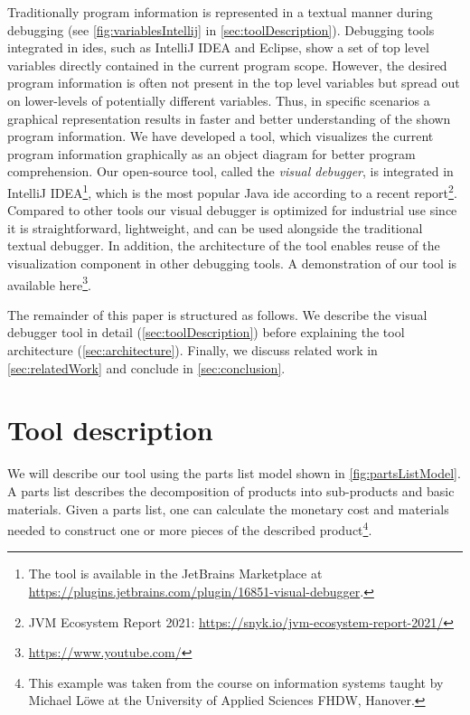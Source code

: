 \documentclass[conference]{IEEEtran}
\newcommand{\intellij}{IntelliJ IDEA}
\newcommand{\screencast}{\url{https://www.youtube.com/}}
\begin{document}
Traditionally program information is represented in a textual manner during debugging (see \autoref{fig:variablesIntellij} in \autoref{sec:toolDescription}).
Debugging tools integrated in \glspl*{ide}, such as \intellij{} and Eclipse, show a set of top level variables directly contained in the current program scope.
However, the desired program information is often not present in the top level variables but spread out on lower-levels of potentially different variables.
Thus, in specific scenarios a graphical representation results in faster and better understanding of the shown program information.
We have developed a tool, which visualizes the current program information graphically as an object diagram for better program comprehension.
Our open-source tool, called the \textit{visual debugger}, is integrated in \intellij{}\footnote{The tool is available in the JetBrains Marketplace at \url{https://plugins.jetbrains.com/plugin/16851-visual-debugger}.}, which is the most popular Java \gls*{ide} according to a recent report\footnote{JVM Ecosystem Report 2021: \url{https://snyk.io/jvm-ecosystem-report-2021/}}.
Compared to other tools our visual debugger is optimized for industrial use since it is straightforward, lightweight, and can be used alongside the traditional textual debugger.
In addition, the architecture of the tool enables reuse of the visualization component in other debugging tools.
A demonstration of our tool is available here\footnote{\screencast}.

The remainder of this paper is structured as follows.
We describe the visual debugger tool in detail (\autoref{sec:toolDescription}) before explaining the tool architecture (\autoref{sec:architecture}).
Finally, we discuss related work in \autoref{sec:relatedWork} and conclude in \autoref{sec:conclusion}.

\section{Tool description} \label{sec:toolDescription}
We will describe our tool using the parts list model shown in \autoref{fig:partsListModel}.
A parts list describes the decomposition of products into sub-products and basic materials.
Given a parts list, one can calculate the monetary cost and materials needed to construct one or more pieces of the described product\footnote{This example was taken from the course on information systems taught by Michael Löwe at the University of Applied Sciences FHDW, Hanover.}.
\end{document}
